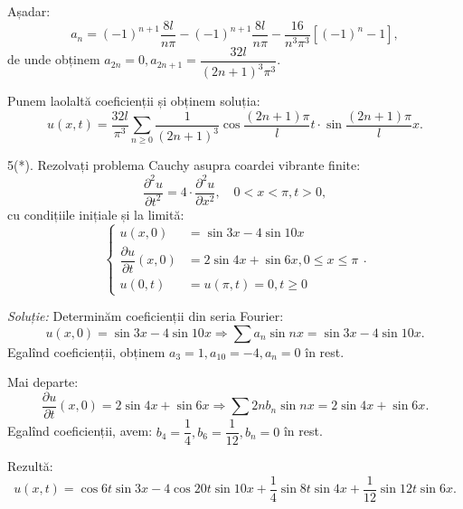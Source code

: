 Așadar:
\[
    a_n = (-1)^{n + 1} \dfrac{8l}{n\pi} - (-1)^{n + 1}\dfrac{8l}{n\pi} - %
    \dfrac{16}{n^3 \pi^3}[(-1)^n - 1],
\]
de unde obținem $ a_{2n} = 0, a_{2n+1} = \dfrac{32l}{(2n + 1)^3 \pi^3} $.

Punem laolaltă coeficienții și obținem soluția:
\[
    u(x, t) = \dfrac{32l}{\pi^3} \sum_{n \geq 0} \dfrac{1}{(2n + 1)^3} \cos\dfrac{(2n + 1)\pi}{l} t %
    \cdot \sin\dfrac{(2n + 1)\pi}{l} x.
\]

\vspace{0.3cm}

5(*). Rezolvați problema Cauchy asupra coardei vibrante finite:
\[
    \dfrac{\partial^2 u}{\partial t^2} = 4 \cdot \dfrac{\partial^2 u}{\partial x^2}, %
    \quad 0 < x < \pi, t > 0,
\]
cu condițiile inițiale și la limită:
\[
    \begin{cases}
        u(x, 0) &= \sin 3x - 4 \sin 10x \\
        \dfrac{\partial u}{\partial t}(x, 0) &= 2 \sin 4x + \sin 6x, 0 \leq x \leq \pi \\
        u(0, t) &= u(\pi, t) = 0, t \geq 0
    \end{cases}.
\]

\vspace{0.3cm}

\emph{Soluție:} Determinăm coeficienții din seria Fourier:
\[
    u(x, 0) = \sin 3x - 4\sin 10x \Rightarrow \sum a_n \sin nx = \sin 3x - 4 \sin 10x.
\]
Egalînd coeficienții, obținem $ a_3 = 1, a_{10} = -4, a_n = 0 $ în rest.

Mai departe:
\[
    \dfrac{\partial u}{\partial t}(x, 0) = 2\sin 4x + \sin 6x \Rightarrow %
    \sum 2nb_n \sin nx = 2\sin 4x + \sin 6x.
\]
Egalînd coeficienții, avem: $ b_4 = \dfrac{1}{4}, b_6 = \dfrac{1}{12}, b_n = 0 $ în rest.

Rezultă:
\[
    u(x, t) = \cos 6t \sin 3x - 4\cos 20t \sin 10x + \dfrac{1}{4} \sin 8t \sin 4x + %
    \dfrac{1}{12} \sin 12t \sin 6x.
\]

\vspace{0.3cm}

